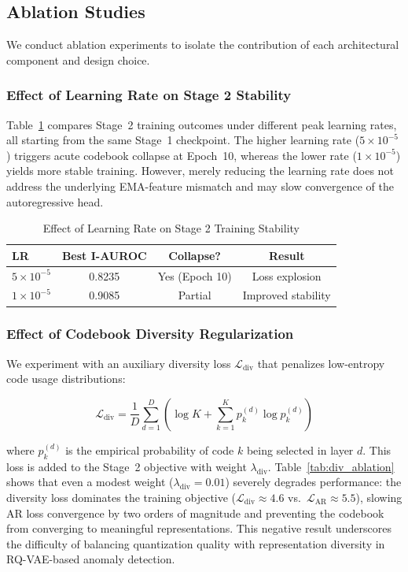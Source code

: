 \documentclass[lettersize,journal]{IEEEtran}
\begin{document}
\subsection{Ablation Studies}

We conduct ablation experiments to isolate the contribution of each architectural component and design choice.

\subsubsection{Effect of Learning Rate on Stage 2 Stability}

Table~\ref{tab:lr_ablation} compares Stage~2 training outcomes under different peak learning rates, all starting from the same Stage~1 checkpoint. The higher learning rate ($5 \times 10^{-5}$) triggers acute codebook collapse at Epoch~10, whereas the lower rate ($1 \times 10^{-5}$) yields more stable training. However, merely reducing the learning rate does not address the underlying EMA-feature mismatch and may slow convergence of the autoregressive head.

\begin{table}[!t]
\caption{Effect of Learning Rate on Stage 2 Training Stability\label{tab:lr_ablation}}
\centering
\begin{tabular}{@{}lccc@{}}
\toprule
\textbf{LR} & \textbf{Best I-AUROC} & \textbf{Collapse?} & \textbf{Result} \\
\midrule
$5 \times 10^{-5}$ & 0.8235 & Yes (Epoch 10) & Loss explosion \\
$1 \times 10^{-5}$ & 0.9085 & Partial & Improved stability \\
\bottomrule
\end{tabular}
\end{table}

\subsubsection{Effect of Codebook Diversity Regularization}

We experiment with an auxiliary diversity loss $\mathcal{L}_{\text{div}}$ that penalizes low-entropy code usage distributions:

\begin{equation}
\label{eq:div_loss}
\mathcal{L}_{\text{div}} = \frac{1}{D} \sum_{d=1}^{D} \left(\log K + \sum_{k=1}^{K} p_k^{(d)} \log p_k^{(d)}\right)
\end{equation}

where $p_k^{(d)}$ is the empirical probability of code $k$ being selected in layer $d$. This loss is added to the Stage~2 objective with weight $\lambda_{\text{div}}$. Table~\ref{tab:div_ablation} shows that even a modest weight ($\lambda_{\text{div}} = 0.01$) severely degrades performance: the diversity loss dominates the training objective ($\mathcal{L}_{\text{div}} \approx 4.6$ vs.~$\mathcal{L}_{\text{AR}} \approx 5.5$), slowing AR loss convergence by two orders of magnitude and preventing the codebook from converging to meaningful representations. This negative result underscores the difficulty of balancing quantization quality with representation diversity in RQ-VAE-based anomaly detection.
\end{document}
